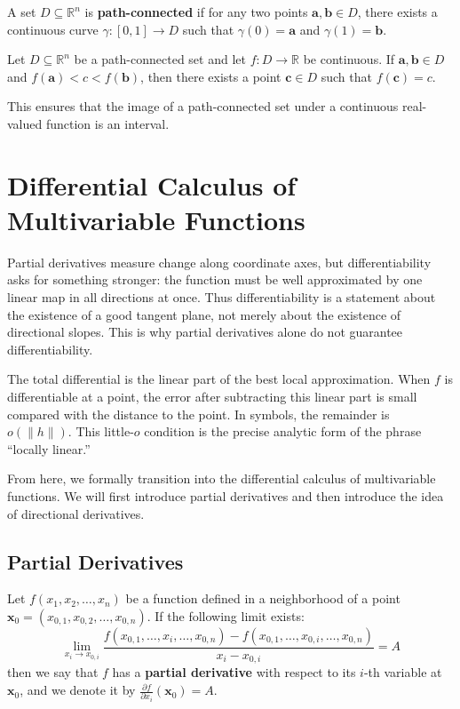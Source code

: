 \begin{definition}
A set $D \subseteq \mathbb{R}^n$ is \textbf{path-connected} if for any two points $\mathbf{a}, \mathbf{b} \in D$, there exists a continuous curve $\gamma: [0, 1] \to D$ such that $\gamma(0) = \mathbf{a}$ and $\gamma(1) = \mathbf{b}$.
\end{definition}

\begin{theorem}
Let $D \subseteq \mathbb{R}^n$ be a path-connected set and let $f: D \to \mathbb{R}$ be continuous. If $\mathbf{a}, \mathbf{b} \in D$ and $f(\mathbf{a}) < c < f(\mathbf{b})$, then there exists a point $\mathbf{c} \in D$ such that $f(\mathbf{c}) = c$.
\end{theorem}

This ensures that the image of a path-connected set under a continuous real-valued function is an interval.

\section{Differential Calculus of Multivariable Functions}


Partial derivatives measure change along coordinate axes, but differentiability asks for something stronger: the function must be well approximated by one linear map in all directions at once. Thus differentiability is a statement about the existence of a good tangent plane, not merely about the existence of directional slopes. This is why partial derivatives alone do not guarantee differentiability.

The total differential is the linear part of the best local approximation. When $f$ is differentiable at a point, the error after subtracting this linear part is small compared with the distance to the point. In symbols, the remainder is $o(\|h\|)$. This little-$o$ condition is the precise analytic form of the phrase ``locally linear.''

From here, we formally transition into the differential calculus of multivariable functions. We will first introduce partial derivatives and then introduce the idea of directional derivatives.

\subsection{Partial Derivatives}

\begin{definition}
Let $f(x_1, x_2, \dots, x_n)$ be a function defined in a neighborhood of a point $\mathbf{x}_0 = (x_{0,1}, x_{0,2}, \dots, x_{0,n})$. If the following limit exists:
\[ \lim_{x_i \to x_{0,i}} \frac{f(x_{0,1}, \dots, x_i, \dots, x_{0,n}) - f(x_{0,1}, \dots, x_{0,i}, \dots, x_{0,n})}{x_i - x_{0,i}} = A \]
then we say that $f$ has a \textbf{partial derivative} with respect to its $i$-th variable at $\mathbf{x}_0$, and we denote it by $\frac{\partial f}{\partial x_i}(\mathbf{x}_0) = A$.
\end{definition}

